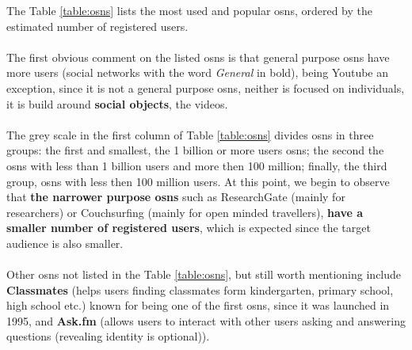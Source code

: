 \indent The Table \ref{table:osns} lists the most used and popular \glspl{osn}, ordered by the estimated number of registered users.
\\\\
\indent The first obvious comment on the listed \glspl{osn} is that general purpose \glspl{osn} have more users (social
networks with the word \textit{General} in bold), being Youtube an exception, since it is not a general purpose \glspl{osn}, neither
is focused on individuals, it is build around \textbf{social objects}, the videos.
\\\\
\indent The grey scale in the first column of Table \ref{table:osns} divides \glspl{osn} in three groups: the first and smallest, the 1 billion
or more users \glspl{osn}; the second the \glspl{osn} with less than 1 billion users and more then 100 million; finally, the third group, \glspl{osn} with
less then 100 million users. At this point, we begin to observe that \textbf{the narrower purpose \glspl{osn}} such as ResearchGate (mainly for researchers) or
Couchsurfing (mainly for open minded travellers), \textbf{have a smaller number of registered users}, which is expected since the target audience is also smaller.
\\\\
\indent Other \glspl{osn} not listed in the Table \ref{table:osns}, but still worth mentioning include \textbf{Classmates} (helps users finding
classmates form kindergarten, primary school, high school etc.) known for being one of the first \glspl{osn}, since it was
launched in 1995, and \textbf{Ask.fm} (allows users to interact with other users asking and answering questions (revealing identity is optional)).

